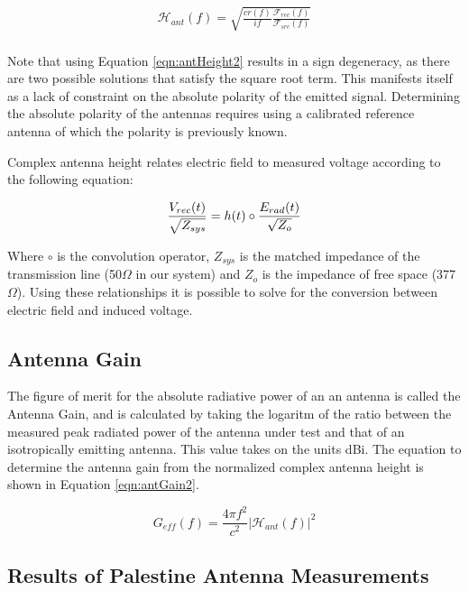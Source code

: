 \begin{gather*}
\mathcal{H}_{ant}(f) = \sqrt{ \frac{c r(f)}{if} \frac{\mathcal{F}_{rec}(f)}{\mathcal{F}_{src}(f)} } \\
\label{eqn:antHeight2}
\end{gather*}

Note that using Equation \ref{eqn:antHeight2} results in a sign degeneracy, as there are two possible solutions that satisfy the square root term.  This manifests itself as a lack of constraint on the absolute polarity of the emitted signal.  Determining the absolute polarity of the antennas requires using a calibrated reference antenna of which the polarity is previously known.


Complex antenna height relates electric field to measured voltage according to the following equation:

\begin{equation}
\frac{V_{rec}(t)}{\sqrt{Z_{sys}}} = h(t) \circ \frac{ E_{rad}(t) }{ \sqrt{Z_{o}} } \\
\label{eqn:antHeight2EField}
\end{equation}

Where $\circ$ is the convolution operator, $Z_{sys}$ is the matched impedance of the transmission line (50$\Omega$ in our system) and $Z_{o}$ is the impedance of free space (377$\Omega$).  Using these relationships it is possible to solve for the conversion between electric field and induced voltage.


	\subsection{Antenna Gain}
		The figure of merit for the absolute radiative power of an an antenna is called the Antenna Gain, and is calculated by taking the logaritm of the ratio between the measured peak radiated power of the antenna under test and that of an isotropically emitting antenna.  This value takes on the units dBi.  The equation to determine the antenna gain from the normalized complex antenna height is shown in Equation \ref{eqn:antGain2}.
		
\begin{equation}
G_{eff}(f) =  \frac{4\pi f^{2}}{c^{2}} | \mathcal{H}_{ant}(f)|^{2}
\label{eqn:antGain2}
\end{equation}

	\subsection{Results of Palestine Antenna Measurements}
	
